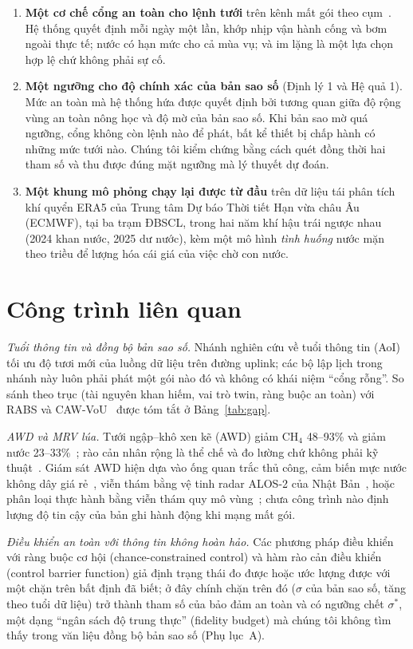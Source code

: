 \documentclass[10pt]{article}
\begin{document}
\begin{enumerate}
\item \textbf{Một cơ chế cổng an toàn cho lệnh tưới} trên kênh mất gói theo cụm~\cite{gilbert1960,elliott1963}. Hệ thống quyết định mỗi ngày một lần, khớp nhịp vận hành cống và bơm ngoài thực tế; nước có hạn mức cho cả mùa vụ; và im lặng là một lựa chọn hợp lệ chứ không phải sự cố.
\item \textbf{Một ngưỡng cho độ chính xác của bản sao số} (Định lý 1 và Hệ quả 1). Mức an toàn mà hệ thống hứa được quyết định bởi tương quan giữa độ rộng vùng an toàn nông học và độ mờ của bản sao số. Khi bản sao mờ quá ngưỡng, cổng không còn lệnh nào để phát, bất kể thiết bị chấp hành có những mức tưới nào. Chúng tôi kiểm chứng bằng cách quét đồng thời hai tham số và thu được đúng mặt ngưỡng mà lý thuyết dự đoán.
\item \textbf{Một khung mô phỏng chạy lại được từ đầu} trên dữ liệu tái phân tích khí quyển ERA5 của Trung tâm Dự báo Thời tiết Hạn vừa châu Âu (ECMWF), tại ba trạm ĐBSCL, trong hai năm khí hậu trái ngược nhau (2024 khan nước, 2025 dư nước), kèm một mô hình \emph{tình huống} nước mặn theo triều để lượng hóa cái giá của việc chờ con nước.
\end{enumerate}

\section{Công trình liên quan}

\emph{Tuổi thông tin và đồng bộ bản sao số.} Nhánh nghiên cứu về tuổi thông tin (AoI) tối ưu độ tươi mới của luồng dữ liệu trên đường uplink; các bộ lập lịch trong nhánh này luôn phải phát một gói nào đó và không có khái niệm ``cổng rỗng''. So sánh theo trục (tài nguyên khan hiếm, vai trò twin, ràng buộc an toàn) với RABS và CAW-VoU~\cite{rabs,cawvou} được tóm tắt ở Bảng~\ref{tab:gap}.

\emph{AWD và MRV lúa.} Tưới ngập--khô xen kẽ (AWD) giảm CH$_4$ 48--93\% và giảm nước 23--33\%~\cite{balaine2019,carrijo2017,yan2005}; rào cản nhân rộng là thể chế và đo lường chứ không phải kỹ thuật~\cite{enriquez2021,lampayan2015}. Giám sát AWD hiện dựa vào ống quan trắc thủ công, cảm biến mực nước không dây giá rẻ~\cite{delacruz2022}, viễn thám bằng vệ tinh radar ALOS-2 của Nhật Bản~\cite{islam2026alose}, hoặc phân loại thực hành bằng viễn thám quy mô vùng~\cite{lovell2019,mlrice2025}; chưa công trình nào định lượng độ tin cậy của bản ghi hành động khi mạng mất gói.

\emph{Điều khiển an toàn với thông tin không hoàn hảo.} Các phương pháp điều khiển với ràng buộc cơ hội (chance-constrained control) và hàm rào cản điều khiển (control barrier function) giả định trạng thái đo được hoặc ước lượng được với một chặn trên bất định đã biết; ở đây chính chặn trên đó ($\sigma$ của bản sao số, tăng theo tuổi dữ liệu) trở thành tham số của bảo đảm an toàn và có ngưỡng chết $\sigma^{*}$, một dạng ``ngân sách độ trung thực'' (fidelity budget) mà chúng tôi không tìm thấy trong văn liệu đồng bộ bản sao số (Phụ lục~A).
\end{document}
